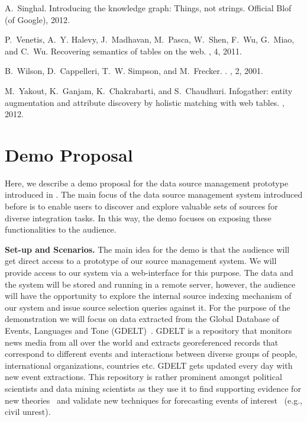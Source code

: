 \documentclass{sig-alternate}
\begin{document}
{\begin{thebibliography}{10}
A.~Singhal.
\newblock Introducing the knowledge graph: Things, not strings.
\newblock Official Blof (of Google), 2012.

P.~Venetis, A.~Y. Halevy, J.~Madhavan, M.~Pasca, W.~Shen, F.~Wu, G.~Miao, and
  C.~Wu.
\newblock Recovering semantics of tables on the web.
, 4, 2011.

B.~Wilson, D.~Cappelleri, T.~W. Simpson, and M.~Frecker.
.
, 2, 2001.

M.~Yakout, K.~Ganjam, K.~Chakrabarti, and S.~Chaudhuri.
\newblock Infogather: entity augmentation and attribute discovery by holistic
  matching with web tables.
, 2012.

\end{thebibliography}
}

\appendix
\section{Demo Proposal}
Here, we describe a demo proposal for the data source management prototype introduced in . The main focus of the data source management system introduced before is to enable users to discover and explore valuable sets of sources for diverse integration tasks. In this way, the demo focuses on exposing these functionalities to the audience. 

\vspace{3pt}\noindent\textbf{Set-up and Scenarios.} The main idea for the demo is that the audience will get direct access to a prototype of our source management system. We will provide access to our system via a web-interface for this purpose. The data and the system will be stored and running in a remote server, however, the audience will have the opportunity to explore the internal source indexing mechanism of our system and issue source selection queries against it. For the purpose of the demonstration we will focus on data extracted from the Global Database of Events, Languages and Tone (GDELT)~\cite{leetaru:2013}. GDELT is a repository that monitors news media from all over the world and extracts georeferenced records that correspond to different events and interactions between diverse groups of people, international organizations, countries etc. GDELT gets updated every day with new event extractions. This repository is rather prominent amongst political scientists and data mining scientists as they use it to find supporting evidence for new theories~\cite{schutte:2014} and validate new techniques for forecasting events of interest~\cite{keneshloo:2014} (e.g., civil unrest). 
\end{document}

